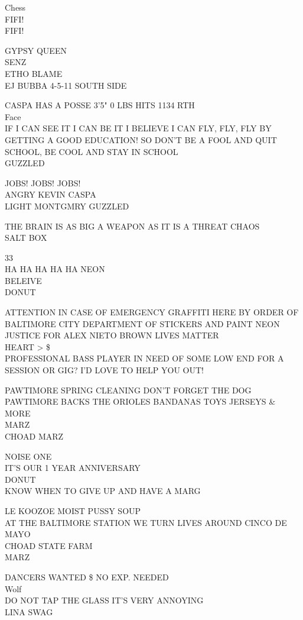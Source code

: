 \documentclass[10pt,letterpaper]{article}
\begin{document}
Chess\\
FIFI!\\
FIFI!

GYPSY QUEEN\\
SENZ\\
ETHO BLAME\\
EJ BUBBA 4{-}5{-}11 SOUTH SIDE

CASPA HAS A POSSE 3'5" 0 LBS HITS 1134 RTH\\
Face\\
IF I CAN SEE IT I CAN BE IT I BELIEVE I CAN FLY, FLY, FLY BY GETTING A GOOD EDUCATION!  SO DON'T BE A FOOL AND QUIT SCHOOL, BE COOL AND STAY IN SCHOOL\\
GUZZLED

JOBS!  JOBS!  JOBS!\\
ANGRY KEVIN CASPA\\
LIGHT MONTGMRY GUZZLED

THE BRAIN IS AS BIG A WEAPON AS IT IS A THREAT CHAOS\\
SALT BOX

33\\
HA HA HA HA HA NEON\\
BELEIVE\\
DONUT

ATTENTION IN CASE OF EMERGENCY GRAFFITI HERE BY ORDER OF BALTIMORE CITY DEPARTMENT OF STICKERS AND PAINT NEON\\
JUSTICE FOR ALEX NIETO BROWN LIVES MATTER\\
HEART > \$\\
PROFESSIONAL BASS PLAYER IN NEED OF SOME LOW END FOR A SESSION OR GIG?  I'D LOVE TO HELP YOU OUT!

PAWTIMORE SPRING CLEANING DON'T FORGET THE DOG\\
PAWTIMORE BACKS THE ORIOLES BANDANAS TOYS JERSEYS \& MORE\\
MARZ\\
CHOAD MARZ

NOISE ONE\\
IT'S OUR 1 YEAR ANNIVERSARY\\
DONUT\\
KNOW WHEN TO GIVE UP AND HAVE A MARG

LE KOOZOE MOIST PUSSY SOUP\\
AT THE BALTIMORE STATION WE TURN LIVES AROUND CINCO DE MAYO\\
CHOAD STATE FARM\\
MARZ

DANCERS WANTED \$ NO EXP. NEEDED\\
Wolf\\
DO NOT TAP THE GLASS IT'S VERY ANNOYING\\
LINA SWAG
\end{document}
